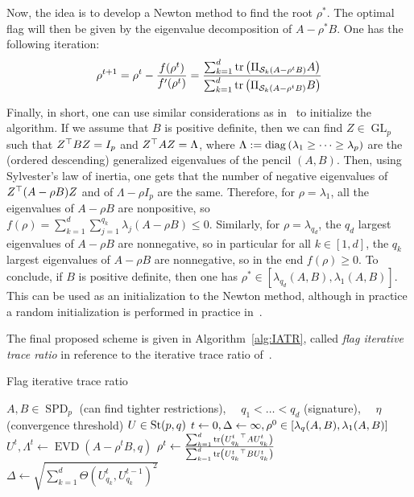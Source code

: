 Now, the idea is to develop a Newton method to find the root $\rho^*$. The optimal flag will then be given by the eigenvalue decomposition of $A - \rho^* B$. One has the following iteration: 
\begin{equation}
    \rho^{t+1} = \rho^t - \frac{f(\rho^t)}{f'(\rho^t)} = \frac{\sum_{k=1}^d \operatorname{tr}\left(\Pi_{\mathcal{S}_k(A - \rho^t B)} A\right)}{\sum_{k=1}^d \operatorname{tr}\left(\Pi_{\mathcal{S}_k(A - \rho^t B)} B\right)}    
\end{equation}

Finally, in short, one can use similar considerations as in~\citet{ngo_trace_2012} to initialize the algorithm.
If we assume that $B$ is positive definite, then we can find $Z\in \operatorname{GL}_p$ such that $Z^\top B Z = I_p$ and $Z^\top A Z = \Lambda$, where $\Lambda := \operatorname{diag}\left(\lambda_1 \geq \dots \geq \lambda_p\right)$ are the (ordered descending) generalized eigenvalues of the pencil $(A, B)$.
Then, using Sylvester's law of inertia, one gets that the number of negative eigenvalues of $Z^\top (A - \rho B) Z$ and of $\Lambda - \rho I_p$ are the same. Therefore, for $\rho = \lambda_1$, all the eigenvalues of $A - \rho B$ are nonpositive, so $f(\rho) = \sum_{k=1}^d \sum_{j=1}^{q_k} \lambda_j (A - \rho B) \leq 0$.
Similarly, for $\rho = \lambda_{q_d}$, the $q_d$ largest eigenvalues of $A - \rho B$ are nonnegative, so in particular for all $k \in [1,d]$, the $q_k$ largest eigenvalues of $A - \rho B$ are nonnegative, so in the end $f(\rho) \geq 0$. To conclude, if $B$ is positive definite, then one has $\rho^* \in [\lambda_{q_d}(A, B), \lambda_{1}(A, B)]$. This can be used as an initialization to the Newton method, although in practice a random initialization is performed in practice in~\citet[Algorithm~4.1]{ngo_trace_2012}.


The final proposed scheme is given in Algorithm~\ref{alg:IATR}, called \textit{flag iterative trace ratio} in reference to the iterative trace ratio of~\citet{wang_trace_2007}.
\begin{algorithm}
\caption{Flag iterative trace ratio}\label{alg:IATR}
\begin{algorithmic}
\Require $A, B \in \operatorname{SPD}_p$ (can find tighter restrictions), $\quad q_1 < \dots < q_d$ (signature), $\quad \eta$ (convergence threshold)
\Ensure
$U \in \operatorname{St}(p, q)$ 
\State $t \gets 0, \Delta \gets \infty, \rho^0 \in \left[\lambda_{q}(A, B), \lambda_{1}(A, B)\right]$
\While{$\Delta > \eta$}
	\State $U^t, \Lambda^t \gets \operatorname{EVD}(A - \rho^t B, q)$
	\State $\rho^t \gets \frac{\sum_{k=1}^d \operatorname{tr}\left({U^t_{q_k}}^\top A U^t_{q_k}\right)}{\sum_{k=1}^d \operatorname{tr}\left({U^t_{q_k}}^\top B U^t_{q_k}\right)}$
    \State $\Delta \gets \sqrt{\sum_{k=1}^{d} \Theta(U^t_{q_k}, U^{t-1}_{q_k})^2}$
\EndWhile
\end{algorithmic}
\end{algorithm}


